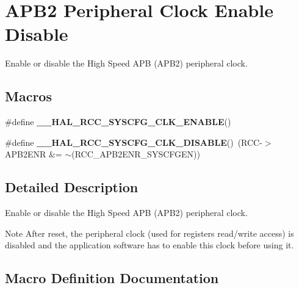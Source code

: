 \hypertarget{group___r_c_c___a_p_b2___clock___enable___disable}{}\section{A\+P\+B2 Peripheral Clock Enable Disable}
\label{group___r_c_c___a_p_b2___clock___enable___disable}


Enable or disable the High Speed A\+PB (A\+P\+B2) peripheral clock.  


\subsection*{Macros}
\begin{DoxyCompactItemize}
\item 
\#define {\bfseries \+\_\+\+\_\+\+H\+A\+L\+\_\+\+R\+C\+C\+\_\+\+S\+Y\+S\+C\+F\+G\+\_\+\+C\+L\+K\+\_\+\+E\+N\+A\+B\+LE}()
\item 
\mbox{\label{group___r_c_c___a_p_b2___clock___enable___disable_gaf04a5f1f0d6d8577706022a866f4528e}} 
\#define {\bfseries \+\_\+\+\_\+\+H\+A\+L\+\_\+\+R\+C\+C\+\_\+\+S\+Y\+S\+C\+F\+G\+\_\+\+C\+L\+K\+\_\+\+D\+I\+S\+A\+B\+LE}()~(R\+CC-\/$>$A\+P\+B2\+E\+NR \&= $\sim$(R\+C\+C\+\_\+\+A\+P\+B2\+E\+N\+R\+\_\+\+S\+Y\+S\+C\+F\+G\+EN))
\end{DoxyCompactItemize}


\subsection{Detailed Description}
Enable or disable the High Speed A\+PB (A\+P\+B2) peripheral clock. 

\begin{DoxyNote}{Note}
After reset, the peripheral clock (used for registers read/write access) is disabled and the application software has to enable this clock before using it. 
\end{DoxyNote}


\subsection{Macro Definition Documentation}
\mbox{\label{group___r_c_c___a_p_b2___clock___enable___disable_gafc3ffcbb86e4913ae336ba094ca199e1}} 
